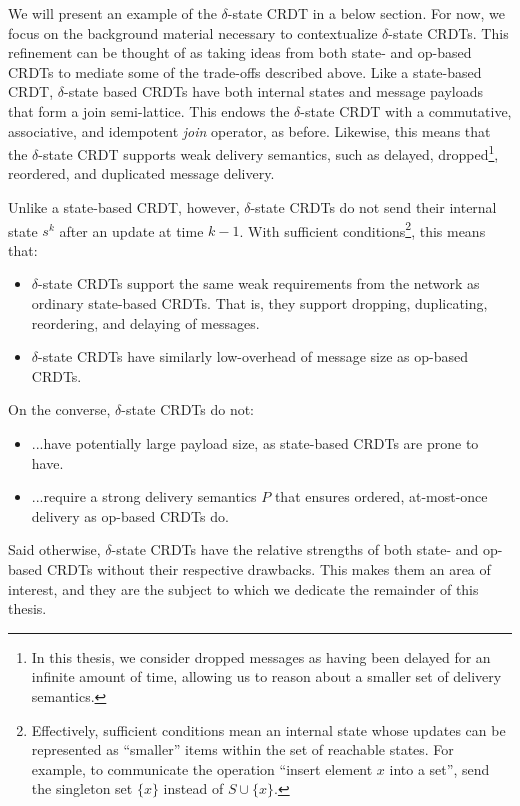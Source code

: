 We will present an example of the $\delta$-state CRDT in a below section. For
now, we focus on the background material necessary to contextualize
$\delta$-state CRDTs. This refinement can be thought of as taking ideas from
both state- and op-based CRDTs to mediate some of the trade-offs described
above. Like a state-based CRDT, $\delta$-state based CRDTs have both internal
states and message payloads that form a join semi-lattice. This endows the
$\delta$-state CRDT with a commutative, associative, and idempotent \emph{join}
operator, as before. Likewise, this means that the $\delta$-state CRDT supports
weak delivery semantics, such as delayed, dropped\footnote{In this thesis, we
consider dropped messages as having been delayed for an infinite amount of time,
allowing us to reason about a smaller set of delivery semantics.}, reordered,
and duplicated message delivery.

Unlike a state-based CRDT, however, $\delta$-state CRDTs do not send their
internal state $s^k$ after an update at time $k-1$. With sufficient
conditions\footnote{Effectively, sufficient conditions mean an internal state
whose updates can be represented as ``smaller'' items within the set of
reachable states. For example, to communicate the operation ``insert element $x$
into a set'', send the singleton set $\{x\}$ instead of $S \cup \{ x \}$.}, this
means that:
\begin{itemize}
  \item $\delta$-state CRDTs support the same weak requirements from the network
    as ordinary state-based CRDTs. That is, they support dropping, duplicating,
    reordering, and delaying of messages.
  \item $\delta$-state CRDTs have similarly low-overhead of message size as
    op-based CRDTs.
\end{itemize}
On the converse, $\delta$-state CRDTs do not:
\begin{itemize}
  \item ...have potentially large payload size, as state-based CRDTs are prone
    to have.
  \item ...require a strong delivery semantics $P$ that ensures ordered,
    at-most-once delivery as op-based CRDTs do.
\end{itemize}
Said otherwise, $\delta$-state CRDTs have the relative strengths of both state-
and op-based CRDTs without their respective drawbacks. This makes them an area
of interest, and they are the subject to which we dedicate the remainder of this
thesis.

